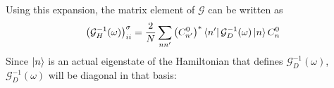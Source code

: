 \documentclass{article}
\numberwithin{equation}{section}
\begin{document}
Using this expansion, the matrix element of $\mathcal{G}$ can be written as
\begin{equation}\begin{aligned}
	\left(\mathcal{G}_{H}^{-1}(\omega)\right)_{ii}^\sigma = \frac{2}{N}\sum_{nn^\prime} \left(C^0_{n^\prime}\right)^*\bra{n^\prime}\mathcal{G}_{D}^{-1}(\omega)\ket{n} C^0_{n}
\end{aligned}\end{equation}
Since $\ket{n}$ is an actual eigenstate of the Hamiltonian that defines \(\mathcal{G}_{D}^{-1}(\omega)\), $\mathcal{G}_{D}^{-1}(\omega)$ will be diagonal in that basis:
\end{document}
